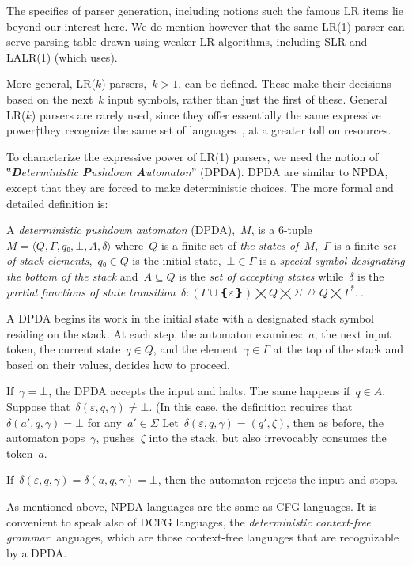 The specifics of parser generation, including notions such the famous LR items lie beyond our interest here.
We do mention however that the same LR(1) parser can serve parsing table drawn using weaker LR algorithms, including SLR and
LALR(1) (which \Self uses).

More general, LR($k$) parsers,~$k>1$, can be defined. These make their
  decisions based on the next~$k$ input symbols, rather than just the first of these.
  General LR($k$) parsers are rarely used, since they offer essentially
the same expressive power†{they recognize the same set of languages~\cite{Knuth:65}}, at a greater toll on resources.

To characterize the expressive power of LR(1) parsers, we need the notion
of ‟\emph{\textbf Deterministic \textbf Pushdown \textbf Automaton}” (DPDA).
DPDA are similar to NPDA, except that they are forced
  to make deterministic choices.
The more formal and detailed definition is:
\begin{Definition}
  \label{Definition:DPDA}
  A \emph{deterministic pushdown automaton} (DPDA),~$M$, is a 6-tuple~$M =⟨Q,Γ, q₀,⊥, A,δ⟩$
  where~$Q$ is a finite set of
  \emph{the states of~$M$},~$Γ$ is a finite
  \emph{set of stack elements},~$q₀∈Q$ is the initial state,~$⊥∈Γ$
  is a \emph{special symbol designating the bottom of the stack}
  and~$A⊆Q$ is the \emph{set of accepting states} while~$δ$ is
  the \emph{partial functions of state transition}~$δ: (Γ∪❴ε❵)⨉Q⨉Σ ↛ Q⨉Γ^*.~$.

A DPDA begins its work in the initial state with a designated stack symbol residing on the stack.
At each step, the automaton examines:~$a$, the next input token, the current state~$q∈Q$, and the element~$γ∈Γ$ at the top of the stack and based on
  their values, decides how to proceed.

If~$γ=⊥$, the DPDA accepts the input and halts.
The same happens if~$q∈A$.
Suppose that~$δ(ε,q,γ) \ne \bot$. 
(In this case, the definition requires that~$δ(a',q,γ)=\bot$ for any~$a'∈Σ$
Let~$δ(ε,q,γ)=(q',ζ)$, then as before, the automaton pops~$γ$,
  pushes~$ζ$ into the stack, but also irrevocably consumes the token~$a$.

If~$δ(ε,q,γ)=δ(a,q,γ)=\bot$, then 
the automaton rejects the input and stops.
\end{Definition}

As mentioned above, NPDA languages are the same as CFG languages.
It is convenient to speak also of DCFG languages, the \emph{deterministic context-free grammar} languages,
  which are those context-free languages that are recognizable by a DPDA.

